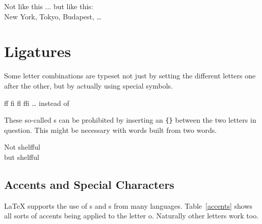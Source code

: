 \begin{chktexignore}
  \begin{example}
Not like this ... but like this:\\
New York, Tokyo, Budapest, \ldots
\end{example}
\end{chktexignore}

\section{Ligatures}

Some letter combinations are typeset not just by setting the
different letters one after the other, but by actually using special
symbols.
\begin{code}
{\large ff fi fl ffi \ldots}\quad
instead of
\end{code}
These so-called s can be prohibited by inserting an \verb|{}|
between the two letters in question. This might be necessary with
words built from two words.

\begin{example}
\Large %
Not shelfful\\
but shelf\mbox{}ful
\end{example}

\subsection{Accents and Special Characters}

\LaTeX{} supports the use of s and s
from many languages. Table~\ref{accents} shows all sorts of accents
being applied to the letter o. Naturally other letters work too.

